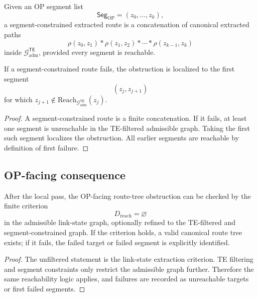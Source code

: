 \begin{definition}
\label{def:v410r14-segment-constrained-extraction}
Given an OP segment list
\[
 \mathsf{Seg}_{\mathrm{OP}}=(z_0,\ldots,z_k),
\]
a segment-constrained extracted route is a concatenation of canonical extracted
paths
\[
 \rho(z_0,z_1)\ast \rho(z_1,z_2)\ast\cdots\ast\rho(z_{k-1},z_k)
\]
inside \(\mathcal G_{\mathrm{adm}}^{\mathsf{TE}}\), provided every segment is
reachable.
\end{definition}

\begin{proposition}
\label{prop:v410r14-segment-failure-localizes-obstruction}
If a segment-constrained route fails, the obstruction is localized to the first
segment
\[
 (z_j,z_{j+1})
\]
for which \(z_{j+1}\notin
\mathrm{Reach}_{\mathcal G_{\mathrm{adm}}^{\mathsf{TE}}}(z_j)\).
\end{proposition}

\begin{proof}
A segment-constrained route is a finite concatenation. If it fails, at least
one segment is unreachable in the TE-filtered admissible graph. Taking the
first such segment localizes the obstruction. All earlier segments are
reachable by definition of first failure.
\end{proof}

\subsection{OP-facing consequence}
\label{subsec:v410r14-op-facing-consequence}

\begin{theorem}
\label{thm:v410r14-route-protocol-criterion}
After the local pass, the OP-facing route-tree obstruction can be checked by the finite
criterion
\[
 D_{\mathrm{reach}}=\varnothing
\]
in the admissible link-state graph, optionally refined to the TE-filtered and
segment-constrained graph. If the criterion holds, a valid canonical route
tree exists; if it fails, the failed target or failed segment is explicitly
identified.
\end{theorem}

\begin{proof}
The unfiltered statement is the link-state extraction criterion. TE filtering
and segment constraints only restrict the admissible graph further. Therefore
the same reachability logic applies, and failures are recorded as unreachable
targets or first failed segments.
\end{proof}

